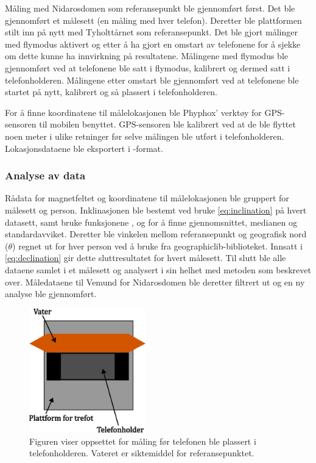 Måling med Nidarosdomen som referansepunkt ble gjennomført først. Det ble gjennomført et målesett (en måling med hver telefon). Deretter ble plattformen stilt inn på nytt med Tyholttårnet som referansepunkt. Det ble gjort målinger med flymodus aktivert og etter å ha gjort en omstart av telefonene for å sjekke om dette kunne ha innvirkning på resultatene. Målingene med flymodus ble gjennomført ved at telefonene ble satt i flymodus, kalibrert og dermed satt i telefonholderen. Målingene etter omstart ble gjennomført ved at telefonene ble startet på nytt, kalibrert og så plassert i telefonholderen.

For å finne koordinatene til målelokasjonen ble Phyphox' verktøy for GPS-sensoren til mobilen benyttet. GPS-sensoren ble kalibrert ved at de ble flyttet noen meter i ulike retninger før selve målingen ble utført i telefonholderen. Lokasjonsdataene ble eksportert i -format.

\subsubsection{Analyse av data}
Rådata for magnetfeltet og koordinatene til målelokasjonen ble gruppert for målesett og person.
Inklinasjonen ble bestemt ved bruke \eqref{eq:inclination} på hvert datasett, samt bruke funksjonene ,  og  for å finne gjennomsnittet, medianen og standardavviket.
Deretter ble vinkelen mellom referansepunkt og geografisk nord ($\theta$) regnet ut for hver person ved å bruke  fra geographiclib-biblioteket.
Innsatt i \eqref{eq:declination} gir dette sluttresultatet for hvert målesett.
Til slutt ble alle dataene samlet i et målesett og analysert i sin helhet med metoden som beskrevet over. 
Måledataene til Vemund for Nidarosdomen ble deretter filtrert ut og en ny analyse ble gjennomført.   
 
\begin{figure}
    \centering
    \includegraphics[width=0.45\textwidth]{img/Plattform med vater.pdf}                 
    \caption{Figuren viser oppsettet for måling før telefonen ble plassert i telefonholderen. Vateret er siktemiddel for referansepunktet.}
    \label{fig:med_vater}
\end{figure}

